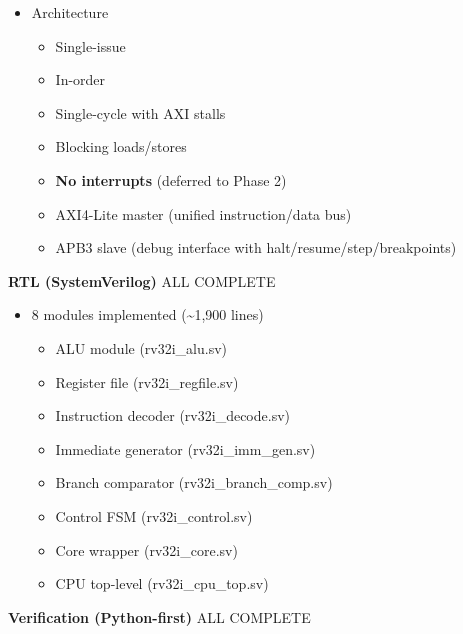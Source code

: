 \begin{record}

\begin{itemize}
\tightlist
\item
  Architecture

  \begin{itemize}
  \tightlist
  \item
    Single-issue
  \item
    In-order
  \item
    Single-cycle with AXI stalls
  \item
    Blocking loads/\allowbreak{}stores
  \item
    \textbf{No interrupts} (deferred to Phase 2)
  \item
    AXI4-Lite master (unified instruction/\allowbreak{}data bus)
  \item
    APB3 slave (debug interface with
    halt/\allowbreak{}resume/\allowbreak{}step/\allowbreak{}breakpoints)
  \end{itemize}
\end{itemize}

\textbf{RTL (SystemVerilog)} \ok{} ALL COMPLETE

\begin{itemize}
\tightlist
\item
  \ok{} 8 modules implemented (\textasciitilde1,900 lines)

  \begin{itemize}
  \tightlist
  \item
    \ok{} ALU module (rv32i\_\allowbreak{}alu.sv)
  \item
    \ok{} Register file (rv32i\_\allowbreak{}regfile.sv)
  \item
    \ok{} Instruction decoder (rv32i\_\allowbreak{}decode.sv)
  \item
    \ok{} Immediate generator
    (rv32i\_\allowbreak{}imm\_\allowbreak{}gen.sv)
  \item
    \ok{} Branch comparator
    (rv32i\_\allowbreak{}branch\_\allowbreak{}comp.sv)
  \item
    \ok{} Control FSM (rv32i\_\allowbreak{}control.sv)
  \item
    \ok{} Core wrapper (rv32i\_\allowbreak{}core.sv)
  \item
    \ok{} CPU top-level (rv32i\_\allowbreak{}cpu\_\allowbreak{}top.sv)
  \end{itemize}
\end{itemize}

\textbf{Verification (Python-first)} \ok{} ALL COMPLETE


\end{record}
